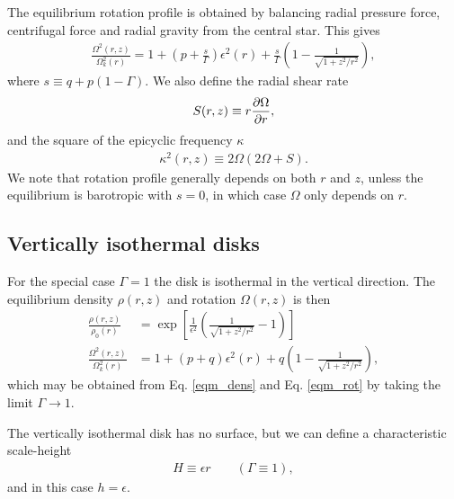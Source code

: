 The equilibrium rotation profile is obtained by balancing radial
pressure force, centrifugal force and radial gravity from the central
star. This gives 
\begin{align}\label{eqm_rot}
  \frac{\Omega^2(r,z)}{\Omega_k^2(r)}=1 +
  \left(p+\frac{s}{\Gamma}\right)\epsilon^2(r) 
  +\frac{s}{\Gamma} \left(1-\frac{1}{\sqrt{1+z^2/r^2}}\right), 
\end{align}
where $s\equiv q+p(1-\Gamma)$. We also define the radial shear rate  
\begin{align}
  S(r,z) \equiv r\frac{\partial\Omega}{\partial r},  
\end{align}
and the square of the epicyclic frequency $\kappa$ 
\begin{align}
  \kappa^2(r,z) \equiv 2\Omega(2\Omega + S). 
\end{align}
We note that rotation profile generally depends on both $r$ and $z$,
unless the equilibrium is barotropic with $s=0$, in which case
$\Omega$ only depends on $r$. 

\subsection{Vertically isothermal disks}
For the special case $\Gamma=1$ the disk is isothermal in the
vertical direction. The equilibrium density $\rho(r,z)$ and rotation
 $\Omega(r,z)$ is then 
 \begin{align}
   \frac{\rho(r,z)}{\rho_0(r)} &= \exp{\left[\frac{1}{\epsilon^2}\left(\frac{1}{\sqrt{1+z^2/r^2}}-1\right)\right]}\\   
   \frac{\Omega^2(r,z)}{\Omega_k^2(r)}& =1+ (p+q)\epsilon^2(r) + q\left(1 -
     \frac{1}{\sqrt{1+z^2/r^2}}\right),
 \end{align}
which may be obtained from Eq. \ref{eqm_dens} and Eq. \ref{eqm_rot} by
taking the limit $\Gamma\to 1$. 

The vertically isothermal disk has no surface, but we can define a
characteristic scale-height
\begin{align}
  H \equiv \epsilon r \quad\quad(\Gamma \equiv 1),   
\end{align} 
and in this case $h = \epsilon$. 

 

